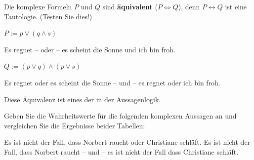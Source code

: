 \begin{frame}

Die komplexe Formeln $P$ und $Q$ sind \textbf{äquivalent} ($P \Leftrightarrow Q$), denn $P \leftrightarrow Q$ ist eine Tautologie. (Testen Sie dies!)

\begin{exe}
	
	 $P := p \lor (q \land s)$
	
	Es regnet -- oder -- es scheint die Sonne und ich bin froh.
	
	 $Q := (p \lor q) \land (p \lor s)$
	
	Es regnet oder es scheint die Sonne -- und -- es regnet oder ich bin froh.
\end{exe}

Diese Äquivalenz ist eines der  in der Aussagenlogik.

\end{frame}


\begin{frame}

Geben Sie die Wahrheitswerte für die folgenden komplexen Aussagen an und vergleichen Sie die Ergebnisse beider Tabellen:

\ea\label{ex:Equi5} Es ist nicht der Fall, dass Norbert raucht oder Christiane schläft.
\ex\label{ex:Equi6} Es ist nicht der Fall, dass Norbert raucht -- und -- es ist nicht der Fall dass Christiane schläft.
\z 	

\end{frame}


